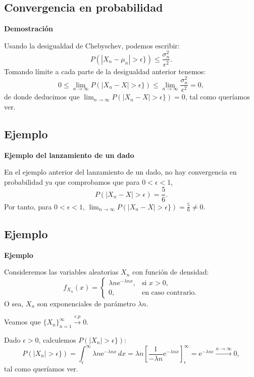\documentclass[]{book}
\begin{document}
\hypertarget{convergencia-en-probabilidad-3}{%
\subsection{Convergencia en probabilidad}\label{convergencia-en-probabilidad-3}}

\textbf{Demostración}

Usando la desigualdad de Chebyschev, podemos escribir:
\[
P(|X_n-\mu_n|>\epsilon \}) \leq \frac{\sigma_n^2}{\epsilon^2}.
\]
Tomando límite a cada parte de la desigualdad anterior tenemos:
\[
0\leq \lim_{n\to\infty} P(|X_n-X|>\epsilon \}) \leq \lim_{n\to\infty}\frac{\sigma_n^2}{\epsilon^2}=0,
\]
de donde deducimos que \(\lim_{n\to\infty} P(|X_n-X|>\epsilon \})=0\), tal como queríamos ver.

\hypertarget{ejemplo-139}{%
\subsection{Ejemplo}\label{ejemplo-139}}

\textbf{Ejemplo del lanzamiento de un dado}

En el ejemplo anterior del lanzamiento de un dado, no hay convergencia en probabilidad ya que comprobamos que para \(0<\epsilon<1\),
\[
P(|X_n-X|>\epsilon)=\frac{5}{6}.
\]
Por tanto, para \(0<\epsilon<1\), \(\lim_{n\to\infty} P(|X_n-X|>\epsilon \})=\frac{5}{6}\neq 0.\)

\hypertarget{ejemplo-140}{%
\subsection{Ejemplo}\label{ejemplo-140}}

\textbf{Ejemplo}

Consideremos las variables aleatorias \(X_n\) con función de densidad:
\[
f_{X_n}(x)=\begin{cases}
\lambda n\mathrm{e}^{-\lambda n x}, & \mbox{si }x>0,\\
0, & \mbox{en caso contrario.}
\end{cases}
\]
O sea, \(X_n\) son exponenciales de parámetro \(\lambda n\).

Veamos que \(\{X_n\}_{n=1}^\infty\stackrel{c.p}{\longrightarrow} 0\).

Dado \(\epsilon >0\), calculemos \(P(|X_n|>\epsilon \})\):
\[
P(|X_n|>\epsilon \}) = \int_\epsilon^\infty \lambda n\mathrm{e}^{-\lambda n x}\, dx =\lambda n \left[\frac{1}{-\lambda n}\mathrm{e}^{-\lambda n x}\right]_\epsilon^\infty =\mathrm{e}^{-\lambda n \epsilon}\stackrel{n\to\infty}{\longrightarrow} 0,
\]
tal como queríamos ver.
\end{document}
